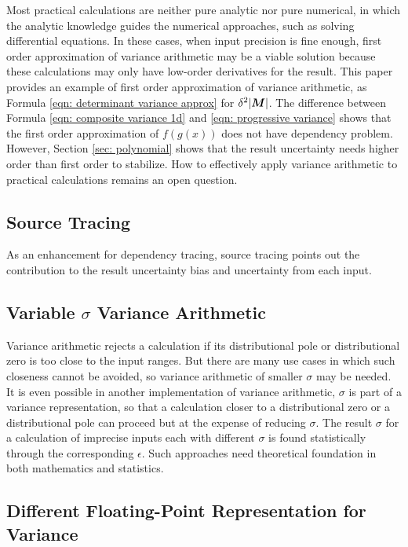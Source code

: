 \documentclass[twoside]{article}
\numberwithin{equation}{section}
\begin{document}
Most practical calculations are neither pure analytic nor pure numerical, in which the analytic knowledge guides the numerical approaches, such as solving differential equations.
In these cases, when input precision is fine enough, first order approximation of variance arithmetic may be a viable solution because these calculations may only have low-order derivatives for the result.
This paper provides an example of first order approximation of variance arithmetic, as Formula \eqref{eqn: determinant variance approx} for $\delta^2 |\protect{\textrm{\boldmath $M$}}|$.
The difference between Formula \eqref{eqn: composite variance 1d} and \eqref{eqn: progressive variance} shows that the first order approximation of $f(g(x))$ does not have dependency problem.
However, Section \ref{sec: polynomial} shows that the result uncertainty needs higher order than first order to stabilize.
How to effectively apply variance arithmetic to practical calculations remains an open question.


\subsection{Source Tracing}

As an enhancement for dependency tracing, source tracing points out the contribution to the result uncertainty bias and uncertainty from each input.



\subsection{Variable $\sigma$ Variance Arithmetic}

Variance arithmetic rejects a calculation if its distributional pole or distributional zero is too close to the input ranges.
But there are many use cases in which such closeness cannot be avoided, so variance arithmetic of smaller $\sigma$ may be needed.
It is even possible in another implementation of variance arithmetic, $\sigma$ is part of a variance representation, so that a calculation closer to a distributional zero or a distributional pole can proceed but at the expense of reducing $\sigma$.
The result $\sigma$ for a calculation of imprecise inputs each with different $\sigma$ is found statistically through the corresponding $\epsilon$.
Such approaches need theoretical foundation in both mathematics and statistics.




\subsection{Different Floating-Point Representation for Variance}
\end{document}
